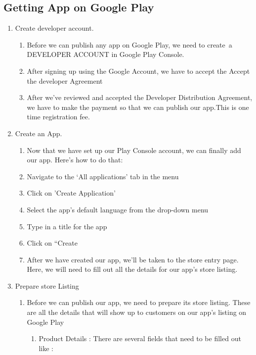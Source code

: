 \subsection{Getting App on Google Play}
 \begin{enumerate}
     \item Create developer account.
    \begin{enumerate}
        \item Before we can publish any app on Google Play, we need to create a DEVELOPER ACCOUNT in Google Play Console.
        \item After signing up using the Google Account, we have to accept the Accept the developer Agreement
        \item After we’ve reviewed and accepted the Developer Distribution Agreement, we have to make the  payment so that we can publish our app.This is one time registration fee.
    \end{enumerate} 
    \item Create an App.
    \begin{enumerate}
        \item Now that we have set up our Play Console account, we can finally add our app. Here’s how to do that:
        \item Navigate to the ‘All applications’ tab in the menu
        \item Click on 'Create Application'
        \item Select the app’s default language from the drop-down menu
        \item Type in a title for the app
        \item Click on “Create
        \item  After we have created our app, we’ll be taken to the store entry page. Here, we will need to fill out all the details for our app’s store listing.
    \end{enumerate}
    \item Prepare store Listing
    \begin{enumerate}
        \item Before we can publish our app, we need to prepare its store listing. These are all the details that will show up to customers on our app’s listing on Google Play
        \begin{enumerate}
            \item Product Details : There are several fields that need to be filled out like :
            \begin{enumerate}

\end{enumerate}
\end{enumerate}
\end{enumerate}
\end{enumerate}
